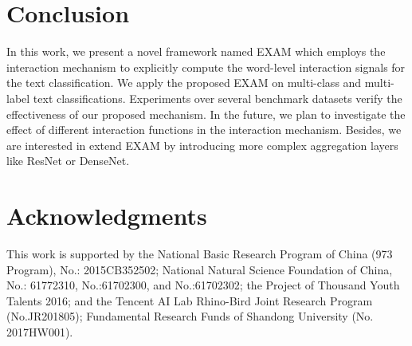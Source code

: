 \documentclass[letterpaper]{article} \usepackage{aaai19}  \usepackage{times}  \usepackage{helvet}  \usepackage{courier}  \usepackage{url}  \usepackage{graphicx}
\begin{document}
\section{Conclusion}
In this work, we present a novel framework named EXAM which employs the interaction mechanism to explicitly compute the word-level interaction signals for the text classification. We apply the proposed EXAM on multi-class and multi-label text classifications. Experiments over several benchmark datasets verify the effectiveness of our proposed mechanism. In the future, we plan to investigate the effect of different interaction functions in the interaction mechanism. Besides, we are interested in extend EXAM by introducing more complex aggregation layers like ResNet or DenseNet.

\section{ Acknowledgments}
This work is supported by the National Basic Research Program of China (973 Program), No.: 2015CB352502; National Natural Science Foundation of China, No.: 61772310, No.:61702300, and No.:61702302; the Project of Thousand Youth Talents 2016; and the Tencent AI Lab Rhino-Bird Joint Research Program (No.JR201805); Fundamental Research Funds of Shandong University (No. 2017HW001).



\end{document}
